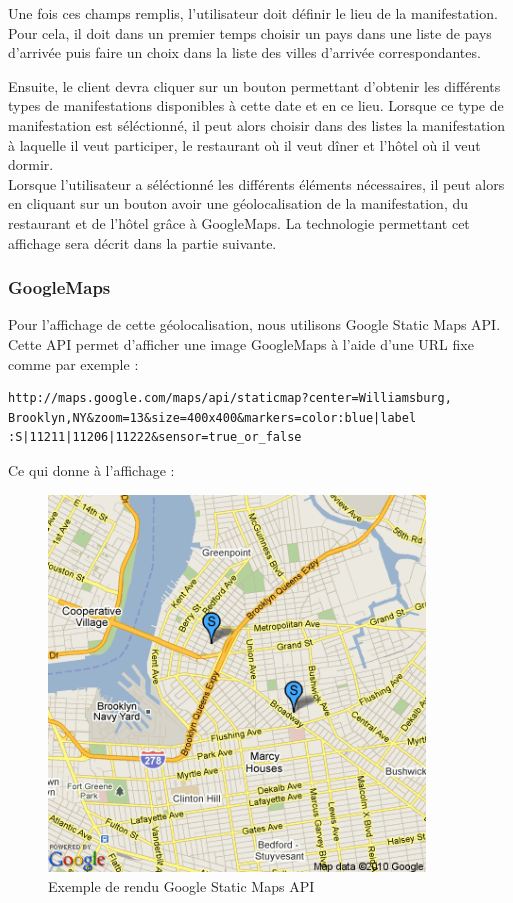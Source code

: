 \documentclass[11pt,a4paper]{article}
\begin{document}
Une fois ces champs remplis, l'utilisateur doit définir le lieu de la
manifestation. Pour cela, il doit dans un premier temps choisir un pays dans une
liste de pays d'arrivée puis faire un choix dans la liste des villes d'arrivée
correspondantes.

Ensuite, le client devra cliquer sur un bouton permettant d'obtenir les
différents types de manifestations disponibles à cette date et en ce lieu.
Lorsque ce type de manifestation est séléctionné, il peut alors choisir dans des
listes la manifestation à laquelle il veut participer, le restaurant où il veut
dîner et l'hôtel où il veut dormir.\\

Lorsque l'utilisateur a séléctionné les différents éléments nécessaires, il
peut alors en cliquant sur un bouton avoir une géolocalisation de la
manifestation, du restaurant et de l'hôtel grâce à GoogleMaps. La technologie
permettant cet affichage sera décrit dans la partie suivante.

\subsubsection{GoogleMaps}
Pour l'affichage de cette géolocalisation, nous utilisons Google Static Maps
API. Cette API permet d'afficher une image GoogleMaps à l'aide d'une URL fixe
comme par exemple :\\
\begin{verbatim}
http://maps.google.com/maps/api/staticmap?center=Williamsburg,
Brooklyn,NY&zoom=13&size=400x400&markers=color:blue|label
:S|11211|11206|11222&sensor=true_or_false
\end{verbatim}

Ce qui donne à l'affichage :

\begin{figure}[h]
  		\centering
  		\includegraphics[height=10cm,width=10cm]{staticmap.png}
  		\caption{Exemple de rendu  Google Static Maps API}
  		\label{googlemaps}
\end{figure}
\end{document}
